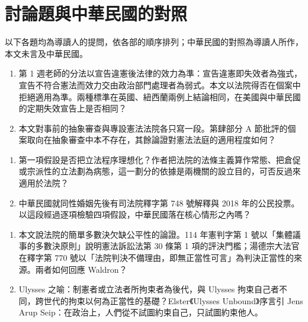 \chapter{討論題與中華民國的對照}

以下各題均為導讀人的提問，依各部的順序排列；中華民國的對照為導讀人所作，本文未言及中華民國。


\begin{qaquestion}
\begin{enumerate}
\item 第 1 週老師的分法以宣告違憲後法律的效力為準：宣告違憲即失效者為強式，宣告不符合憲法而效力交由政治部門處理者為弱式。本文以法院得否在個案中拒絕適用為準。兩種標準在英國、紐西蘭兩例上結論相同，在美國與中華民國的定期失效宣告上是否相同？
\item 本文對事前的抽象審查與專設憲法法院各只寫一段。第肆部分 A 節批評的個案取向在抽象審查中本不存在，其餘論證對憲法法庭的適用程度如何？
\end{enumerate}
\end{qaquestion}


\begin{qaquestion}
\begin{enumerate}
\item 第一項假設是否把立法程序理想化？作者把法院的法條主義算作常態、把倉促或宗派性的立法劃為病態，這一劃分的依據是兩機關的設立目的，可否反過來適用於法院？
\item 中華民國就同性婚姻先後有司法院釋字第 748 號解釋與 2018 年的公民投票。以這段經過逐項檢驗四項假設，中華民國落在核心情形之內嗎？
\end{enumerate}
\end{qaquestion}


\begin{qaquestion}
\begin{enumerate}
\item 本文說法院的簡單多數決欠缺公平性的論證。114 年憲判字第 1 號以「集體議事的多數決原則」說明憲法訴訟法第 30 條第 1 項的評決門檻；湯德宗大法官在釋字第 770 號以「法院判決不備理由，即無正當性可言」為判決正當性的來源。兩者如何回應 Waldron？
\item Ulysses 之喻：制憲者或立法者所拘束者為後代，與 Ulysses 拘束自己者不同，跨世代的拘束以何為正當性的基礎？Elster《Ulysses Unbound》序言引 Jens Arup Seip：在政治上，人們從不試圖約束自己，只試圖約束他人。
\end{enumerate}
\end{qaquestion}

